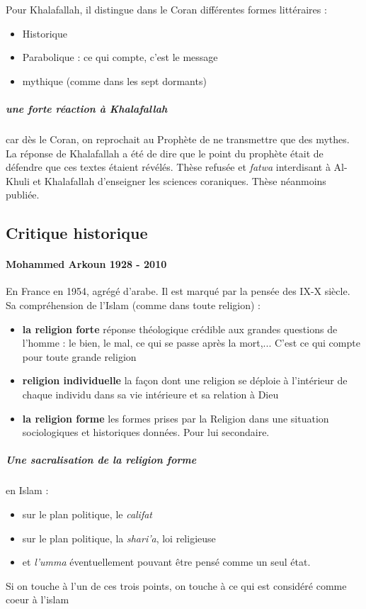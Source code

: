 Pour Khalafallah, il distingue dans le Coran différentes formes littéraires : 
\begin{itemize}
    \item Historique
    \item Parabolique : ce qui compte, c'est le message
    \item mythique (comme dans les sept dormants)
\end{itemize}

\subparagraph{une forte réaction à Khalafallah} car dès le Coran, on reprochait au Prophète de ne transmettre que des mythes. La réponse de Khalafallah a été de dire que le point du prophète était de défendre que ces textes étaient révélés. Thèse refusée et \textit{fatwa} interdisant à Al-Khuli et Khalafallah d'enseigner les sciences coraniques. Thèse néanmoins publiée.


\subsection{Critique historique}

\paragraph{Mohammed Arkoun 1928 - 2010} \label{theol:Arkoun5} En France en 1954, agrégé d'arabe. Il est marqué par la pensée des IX-X siècle. Sa compréhension de l'Islam (comme dans toute religion) : 
\begin{itemize}
    \item \textbf{la religion forte} réponse théologique crédible aux grandes questions de l'homme : le bien, le mal, ce qui se passe après la mort,... C'est ce qui compte pour toute grande religion
    \item \textbf{religion individuelle} la façon dont une religion se déploie à l'intérieur de chaque individu dans sa vie intérieure et sa relation à Dieu
    \item \textbf{la religion forme} les formes prises par la Religion dans une situation sociologiques et historiques données. Pour lui secondaire. 
\end{itemize}

\subparagraph{Une sacralisation de la religion forme} en Islam :
\begin{itemize}
    \item sur le plan politique, le \textit{califat}
    \item sur le plan politique, la \textit{shari'a}, loi religieuse
    \item et \textit{l'umma} éventuellement pouvant être pensé comme un seul état.
\end{itemize}
Si on touche à l'un de ces trois points, on touche à ce qui est considéré comme coeur à l'islam

